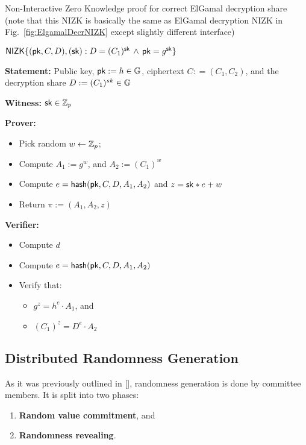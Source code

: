\FloatBarrier
\begin{boxfig}{\label{fig:DecrShareNIZK}Non-Interactive Zero Knowledge proof for correct ElGamal decryption share (note that this NIZK is basically the same as ElGamal decryption NIZK in Fig.~\ref{fig:ElgamalDecrNIZK} except slightly different interface)}{}
\begin{center}
$\mathsf{NIZK}\{(\mathsf{pk}, C, D ),(\mathsf{sk}): D = (C_1)^{\mathsf{sk}} \, \wedge \, \mathsf{pk} = g^{\mathsf{sk}}\}$
\end{center}

\textbf{Statement:} Public key, $\mathsf{pk}:=h \in\mathbb{G}$,  ciphertext $C: =(C_1, C_2 )$, and the decryption share $D:=(C_1)^{sk} \in\mathbb{G}$

\textbf{Witness:} $\mathsf{sk}\in\mathbb{Z}_p$

\medskip
\textbf{Prover:}
\begin{itemize}
\item Pick random $w \leftarrow  {\mathbb{Z}_p}$; 
\item Compute $A_1 := g^w$, and $A_2 := (C_1)^w $
\item Compute $e = \mathsf{hash}(\mathsf{pk},C,D,A_1,A_2)$ and  $ z = \mathsf{sk}*e + w$
\item Return $\pi:=(A_1,A_2,z)$
\end{itemize}

\textbf{Verifier:}
\begin{itemize}
\item Compute $d$
\item Compute $e = \mathsf{hash}(\mathsf{pk},C,D,A_1,A_2)$
\item Verify that:
    \begin{itemize}
    \item $g^z = h^e \cdot A_1$, and
    \item $(C_1)^{z} = D^e \cdot A_2$ 
    \end{itemize}
\end{itemize}
\end{boxfig}

\subsection{Distributed Randomness Generation}

As it was previously outlined in [], randomness generation is done by committee members. It is split into two phases:
\begin{enumerate}
	\item \textbf{Random value commitment}, and
	\item \textbf{Randomness revealing}.
\end{enumerate}

